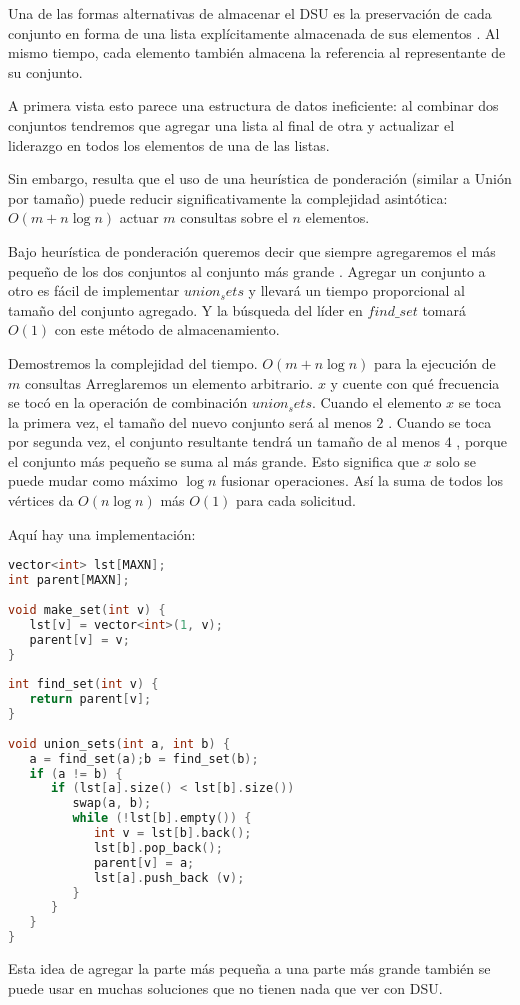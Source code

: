 \begin{itemize}
	 Una de las formas alternativas de almacenar el DSU es la preservación de cada conjunto en forma de una lista explícitamente almacenada de sus elementos . Al mismo tiempo, cada elemento también almacena la referencia al representante de su conjunto.
	 
	 A primera vista esto parece una estructura de datos ineficiente: al combinar dos conjuntos tendremos que agregar una lista al final de otra y actualizar el liderazgo en todos los elementos de una de las listas.
	 
	 Sin embargo, resulta que el uso de una heurística de ponderación (similar a Unión por tamaño) puede reducir significativamente la complejidad asintótica: $O(m + n \log n)$ actuar $m$ consultas sobre el $n$ elementos.
	 
	 Bajo heurística de ponderación queremos decir que siempre agregaremos el más pequeño de los dos conjuntos al conjunto más grande . Agregar un conjunto a otro es fácil de implementar $union_sets$ y llevará un tiempo proporcional al tamaño del conjunto agregado. Y la búsqueda del líder en $find\_set$ tomará $O(1)$ con este método de almacenamiento.
	 
	 Demostremos la complejidad del tiempo. $O(m + n \log n)$ para la ejecución de $m$ consultas 
	 Arreglaremos un elemento arbitrario. $x$ y cuente con qué frecuencia se tocó en la operación 
	 de combinación $union_sets$. Cuando el elemento $x$ se toca la primera vez, el tamaño del 
	 nuevo conjunto será al menos $2$ . Cuando se toca por segunda vez, el conjunto resultante 
	 tendrá un tamaño de al menos $4$ , porque el conjunto más pequeño se suma al más grande. 
	 Esto significa que $x$ solo se puede mudar como máximo $\log n$ fusionar operaciones. Así la suma de todos los vértices da $O(n \log n)$ más $O(1)$ para cada solicitud.
	 
	 Aquí hay una implementación:
	 \begin{lstlisting}[language=C++]
vector<int> lst[MAXN];
int parent[MAXN];
	 
void make_set(int v) {
   lst[v] = vector<int>(1, v);
   parent[v] = v;
}
	 
int find_set(int v) {
   return parent[v];
}
	 
void union_sets(int a, int b) {
   a = find_set(a);b = find_set(b);
   if (a != b) {
      if (lst[a].size() < lst[b].size())
         swap(a, b);
         while (!lst[b].empty()) {
            int v = lst[b].back();
            lst[b].pop_back();
            parent[v] = a;
            lst[a].push_back (v);
         }
      }
   }
}
	\end{lstlisting}
	 Esta idea de agregar la parte más pequeña a una parte más grande también se puede usar en muchas soluciones que no tienen nada que ver con DSU.
	 

\end{itemize}
